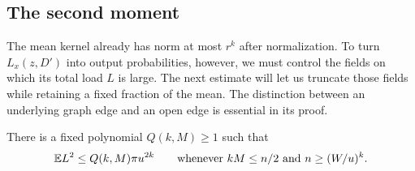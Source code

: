\subsection{The second moment}\label{amp:second-moment-section}

The mean kernel already has norm at most $r^k$ after normalization.
To turn $L_x(z,D')$ into output probabilities, however, we must control
the fields on which its total load $L$ is large.  The next estimate will
let us truncate those fields while retaining a fixed fraction of the
mean.  The distinction between an underlying graph edge and an open
edge is essential in its proof.

\begin{lemma}\label{amp:second-moment}
There is a fixed polynomial $Q(k,M)\ge1$ such that
\begin{equation}\label{eq:s14}
 \mathbb E L^2\le Q(k,M)\pi u^{2k}
 \qquad\text{whenever } kM\le n/2
               \text{ and } n\ge(W/u)^k.
\end{equation}
\end{lemma}

